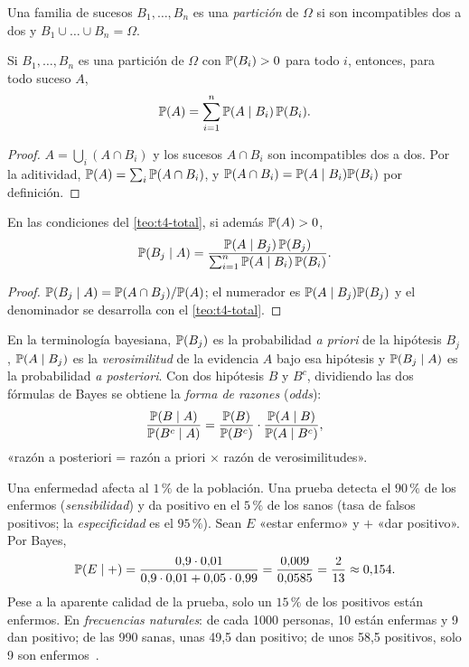 \begin{definicion}
Una familia de sucesos $B_1,\dots,B_n$ es una \emph{partición} de $\Omega$ si son incompatibles dos a dos y $B_1\cup\dots\cup B_n=\Omega$.
\end{definicion}

\begin{teorema}\label{teo:t4-total}
Si $B_1,\dots,B_n$ es una partición de $\Omega$ con $\mathbb{P}(B_i)>0$ para todo $i$, entonces, para todo suceso $A$,
\[
\mathbb{P}(A)=\sum_{i=1}^{n}\mathbb{P}(A\mid B_i)\,\mathbb{P}(B_i).
\]
\end{teorema}

\begin{proof}
$A=\bigcup_i(A\cap B_i)$ y los sucesos $A\cap B_i$ son incompatibles dos a dos. Por la aditividad, $\mathbb{P}(A)=\sum_i\mathbb{P}(A\cap B_i)$, y $\mathbb{P}(A\cap B_i)=\mathbb{P}(A\mid B_i)\mathbb{P}(B_i)$ por definición.
\end{proof}

\begin{teorema}[Bayes]\label{teo:t4-bayes}
En las condiciones del \cref{teo:t4-total}, si además $\mathbb{P}(A)>0$,
\[
\mathbb{P}(B_j\mid A)=\frac{\mathbb{P}(A\mid B_j)\,\mathbb{P}(B_j)}{\sum_{i=1}^{n}\mathbb{P}(A\mid B_i)\,\mathbb{P}(B_i)}.
\]
\end{teorema}

\begin{proof}
$\mathbb{P}(B_j\mid A)=\mathbb{P}(A\cap B_j)/\mathbb{P}(A)$; el numerador es $\mathbb{P}(A\mid B_j)\mathbb{P}(B_j)$ y el denominador se desarrolla con el \cref{teo:t4-total}.
\end{proof}

En la terminología bayesiana, $\mathbb{P}(B_j)$ es la probabilidad \emph{a priori} de la hipótesis $B_j$, $\mathbb{P}(A\mid B_j)$ es la \emph{verosimilitud} de la evidencia $A$ bajo esa hipótesis y $\mathbb{P}(B_j\mid A)$ es la probabilidad \emph{a posteriori}. Con dos hipótesis $B$ y $B^{c}$, dividiendo las dos fórmulas de Bayes se obtiene la \emph{forma de razones} (\emph{odds}):
\[
\frac{\mathbb{P}(B\mid A)}{\mathbb{P}(B^{c}\mid A)}=\frac{\mathbb{P}(B)}{\mathbb{P}(B^{c})}\cdot\frac{\mathbb{P}(A\mid B)}{\mathbb{P}(A\mid B^{c})},
\]
«razón a posteriori = razón a priori $\times$ razón de verosimilitudes».

\begin{ejemplo}\label{ej:t4-diagnostico}
Una enfermedad afecta al $1\,\%$ de la población. Una prueba detecta el $90\,\%$ de los enfermos (\emph{sensibilidad}) y da positivo en el $5\,\%$ de los sanos (tasa de falsos positivos; la \emph{especificidad} es el $95\,\%$). Sean $E$ «estar enfermo» y $+$ «dar positivo». Por Bayes,
\[
\mathbb{P}(E\mid +)=\frac{0{,}9\cdot0{,}01}{0{,}9\cdot0{,}01+0{,}05\cdot0{,}99}=\frac{0{,}009}{0{,}0585}=\frac{2}{13}\approx0{,}154.
\]
Pese a la aparente calidad de la prueba, solo un $15\,\%$ de los positivos están enfermos. En \emph{frecuencias naturales}: de cada 1000 personas, 10 están enfermas y 9 dan positivo; de las 990 sanas, unas 49,5 dan positivo; de unos 58,5 positivos, solo 9 son enfermos~\cite[§17.4.2 y §17.4.4]{mcs}.
\end{ejemplo}

